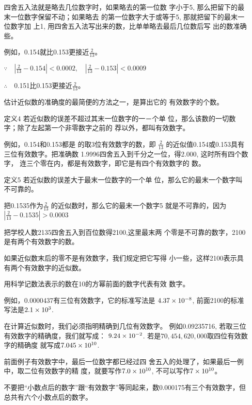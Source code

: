 四舍五入法就是略去几位数字时，如果略去的第一位数
字小于5, 那么把留下的最末一位数字保留不动；如果略去
的第一位数字大于或等于5, 那就把留下的最末一位数字加
上1, 用四舍五入法写出来的数，比单单略去最后几位数后写
出的数准确些。

例如，0.154就比0.153更接近$\frac{2}{13}$。

$\because\quad \left|\frac{2}{13}-0.154\right|<0.0002,\quad \left|\frac{2}{13}-0.153\right|<0.0009$

$\therefore\quad $0.151比0.153更接近$\frac{2}{13}$。

估计近似数的准确度的最简便的方法之一，是算出它的
有效数字的个数。

\begin{blk}{定义4}
    若近似数的误差不超过其末一位数字的一－个单
位，那么该数的一切数字；除了左起第一个非零数字之前的
荐以外，都叫有效数字。
\end{blk}


例如，0.154和0.153都是
的取3位有效数字的数，即
$\frac{2}{13}$
的近似值0.154或0.153具有三位有效数字。把准确数
1.9996四舍五入到千分之一位，得2.000, 这时所有四个数字，
连三个零在内，都是有效数字，即它是有四个有效数字的
数。

\begin{blk}{定义5}
    若近似数的误差大于最末一位数字的一个单
    位，那么它的最末一个数字叫不可靠的。  
\end{blk}

把0.1535作为$\frac{2}{13}$
的近似数时，那么它的最末一个数字5
就是不可靠的，因为
$\left|\frac{2}{13}-0.1535\right|>0.0003$

把学校人数2135四舍五入到百位数得2100,这里最末两
个零是不可靠的数字，2100是有两个有效数字的数。

如果近似数末后的零不是有效数字，我们规定把它写得
小一些，这样21{\small00}表示具有两个有效数字的近似数。

用科学记数法表示的数在10的方幂前面的数字代表有效
数字。

例如，0.0000437有三位有效数字，它的标准写法是
$4.37\times10^{-8}$, 前面2100的标准写法是$2.1\times10^3$.

在计算近似数时，我们必须指明精确到几位有效数字。
例如0.09235716, 若取三位有效数字的精确度，我们就写成：
$9.24\times10^{-2}$. 若是$70,454,620,000$取四位有效数字的精确度
就写成$7.045\times10^{10}$.

\begin{rmk}
前面例子有效数字中，最后一位数字都已经过四
舍五入的处理了，如果最后一例中，取二位有效数字的精
度，就要写作$7.0\times10^{10}$, 不可以写作$7\times10^{10}$。  

不要把“小数点后的数字”跟“有效数字”等同起来，数0.000175有三个有效数字，但总共有六个小数点后的数字。
\end{rmk}

